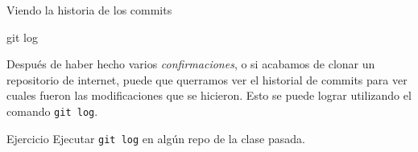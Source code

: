 \begin{frame}[t]{Viendo la historia de los commits}
    \begin{comando}
        git log
    \end{comando}

    \pause
    \begin{block}{}
        Después de haber hecho varios \textit{confirmaciones}, o si acabamos de clonar un repositorio
        de internet, puede que querramos ver el historial de commits para ver cuales
        fueron las modificaciones que se hicieron. Esto se puede lograr utilizando el
        comando \texttt{git log}.
    \end{block}

    \pause
    \begin{ejercicio}{Ejercicio}
        Ejecutar \texttt{git log} en algún repo de la clase pasada.
    \end{ejercicio}
\end{frame}

